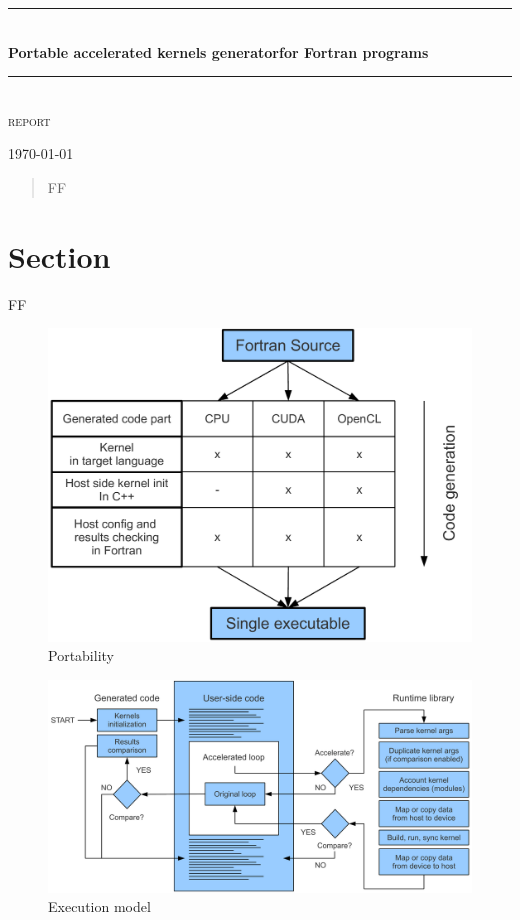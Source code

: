 \documentclass[a4,12pt]{article}
\newcommand{\HRule}{\rule{\linewidth}{0.5mm}}
\begin{document}
\begin{titlepage}

\begin{center}

\HRule \\[0.4cm]
{ \huge \bfseries Portable accelerated kernels generator\linebreak for Fortran programs}\\[0.4cm]

\HRule \\[0.5cm]

\textsc{\Large report}\\[1.5cm]


\vfill

{\large \today}

\end{center}

\end{titlepage}

\begin{abstract}

FF

\end{abstract}

\section{Section}

FF

\begin{figure}
\centering
\includegraphics[scale=0.5]{figures/portability.pdf}
\caption{Portability}
\label{fig:portability}
\end{figure}

\begin{figure}
\centering
\includegraphics[scale=0.4]{figures/execution.pdf}
\caption{Execution model}
\label{fig:execution}
\end{figure}
\end{document}
